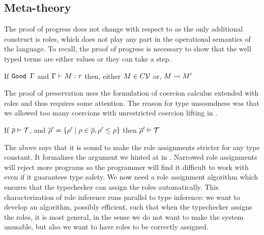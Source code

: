 \documentclass[screen,nonacm,manuscript,review]{acmart} %
\begin{document}
\subsection{Meta-theory}\label{sec:sfr-metatheory}
The proof of progress does not change with respect to \SFC as the only additional construct is roles, which does not play any part in the operational semantics of the language. To recall, the proof of progress is necessary to show that the well typed terms are either values or they can take a step.

\begin{theorem}\label{lem:sfr-progress}
 If $\texttt{Good~}\Gamma$ and $\Gamma \vdash M : \tau$ then, either $M \in C\mathcal{V}$ or, $M \rightsquigarrow M'$
\end{theorem}

The proof of preservation uses the formulation of coercion calculus extended with roles and thus requires some attention. The reason for type unsoundness was that we allowed too many coercions with unrestricted coercion lifting in \SFC.

\begin{lemma}\label{lem:role-narrowing}
If $\overline{\rho} \mathrel{\vDash} \mathcal{T}$, and $\overline{\rho}' = \{\rho' \mid \rho \in \overline{\rho}, \rho' \leq \rho\}$ then $\overline{\rho}' \mathrel{\vDash} \mathcal{T}$
\end{lemma}

The above  says that it is sound to make the role assignments stricter for any type constant. It formalizes the argument we hinted at in . Narrowed role assignments will reject more programs so the programmer will find it difficult to work with even if it guarantees type safety.
We now need a role assignment algorithm which ensures that the typechecker can assign the roles automatically. This characterization of role inference runs parallel to type inference: we want to develop an algorithm, possibly efficient, such that when the typechecker assigns the roles, it is most general, in the sense we do not want to make the system unusable, but also we want to have roles to be correctly assigned.
\end{document}
